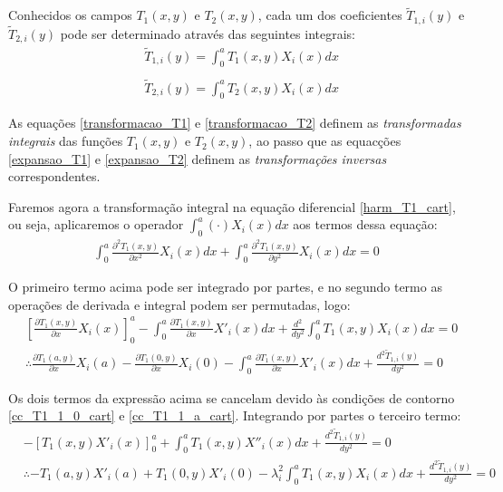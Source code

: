 Conhecidos os campos $T_1(x, y)$ e $T_2(x, y)$, cada um dos coeficientes $\tilde{T}_{1, i}(y)$ e $\tilde{T}_{2, i}(y)$ pode ser determinado
através das seguintes integrais:
\begin{align}
	& \tilde{T}_{1, i}(y) = \int_0^a T_1(x, y) X_i(x)dx \label{transformacao_T1} \\ \nonumber \\
	& \tilde{T}_{2, i}(y) = \int_0^a T_2(x, y) X_i(x)dx \label{transformacao_T2}
\end{align}

As equações \eqref{transformacao_T1} e \eqref{transformacao_T2} definem as \textit{transformadas integrais}
das funções $T_1(x, y)$ e $T_2(x, y)$, ao passo que as equacções \eqref{expansao_T1} e \eqref{expansao_T2}
definem as \textit{transformações inversas} correspondentes.

Faremos agora a transformação integral na equação diferencial \eqref{harm_T1_cart}, ou seja, aplicaremos
o operador $\displaystyle\int_0^a \left(\cdot\right)X_i(x)dx$ aos termos dessa equação: 
\begin{align}
	\int_0^a \frac{\partial^2 T_1(x, y)}{\partial x^2}X_i(x)dx
	+
	\int_0^a \frac{\partial^2 T_1(x, y)}{\partial y^2}X_i(x)dx
	=
	0
\end{align}

O primeiro termo acima pode ser integrado por partes, e no segundo termo as operações de derivada e integral
podem ser permutadas, logo:
 \begin{align}
 	& \left[\frac{\partial T_1(x, y)}{\partial x}X_i(x)\right]_0^a - 
	\int_0^a \frac{\partial T_1(x, y)}{\partial x}X'_i(x)dx
	+
	\frac{d^2}{dy^2}\int_0^a T_1(x, y)X_i(x)dx
	=
	0 \nonumber \\
	& \therefore
	\frac{\partial T_1(a, y)}{\partial x}X_i(a) - \frac{\partial T_1(0, y)}{\partial x}X_i(0)
	-
	\int_0^a \frac{\partial T_1(x, y)}{\partial x}X'_i(x)dx
	+
	\frac{d^2 \tilde{T}_{1, i}(y)}{dy^2}
	=
	0
\end{align}

Os dois termos da expressão acima se cancelam devido às condições de contorno \eqref{cc_T1_1_0_cart} e \eqref{cc_T1_1_a_cart}.
Integrando por partes o terceiro termo:
\begin{align}
 	&
 	-
 	\left[ T_1(x, y)X'_i(x) \right]_0^a
	+
	\int_0^a  T_1(x, y)X''_i(x)dx
	+
	\frac{d^2 \tilde{T}_{1, i}(y)}{dy^2}
	=
	0 \nonumber \\
	& \therefore
 	-
 	T_1(a, y)X'_i(a)
 	+
 	T_1(0, y)X'_i(0)
	-
	\lambda_i^2
	\int_0^a  T_1(x, y)X_i(x)dx
	+
	\frac{d^2 \tilde{T}_{1, i}(y)}{dy^2}
	=
	0
\end{align}

